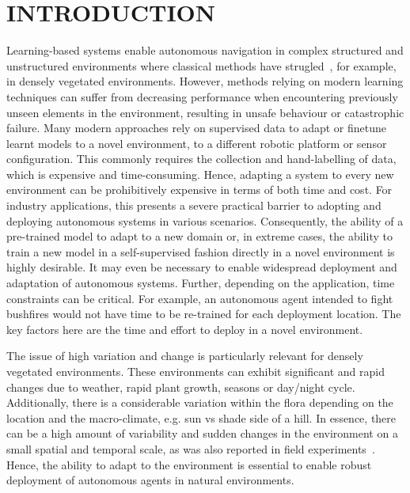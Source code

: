 \section{INTRODUCTION}
Learning-based systems enable autonomous navigation in complex structured and unstructured environments where classical methods have strugled~\cite{frey2023fast, guastella2021learning}, for example, in densely vegetated environments. However, methods relying on modern learning techniques can suffer from decreasing performance when encountering previously unseen elements in the environment, resulting in unsafe behaviour or catastrophic failure. 
%
Many modern approaches rely on supervised data to adapt or finetune learnt models to a novel environment, to a different robotic platform or sensor configuration. This commonly requires the collection and hand-labelling of data, which is expensive and time-consuming. Hence, adapting a system to every new environment can be prohibitively expensive in terms of both time and cost. For industry applications, this presents a severe practical barrier to adopting and deploying autonomous systems in various scenarios.
%
Consequently, the ability of a pre-trained model to adapt to a new domain or, in extreme cases, the ability to train a new model in a self-supervised fashion directly in a novel environment is highly desirable. It may even be necessary to enable widespread deployment and adaptation of autonomous systems. Further, depending on the application, time constraints can be critical. For example, an autonomous agent intended to fight bushfires would not have time to be re-trained for each deployment location. The key factors here are the time and effort to deploy in a novel environment.

The issue of high variation and change is particularly relevant for densely vegetated environments. These environments can exhibit significant and rapid changes due to weather,  rapid plant growth, seasons or day/night cycle.  Additionally, there is a considerable variation within the flora depending on the location and the macro-climate, e.g. sun vs shade side of a hill. In essence, there can be a high amount of variability and sudden changes in the environment on a small spatial and temporal scale, as was also reported in field experiments~\cite{bradley2015scene, frey2023fast}. Hence, the ability to adapt to the environment is essential to enable robust deployment of autonomous agents in natural environments.

